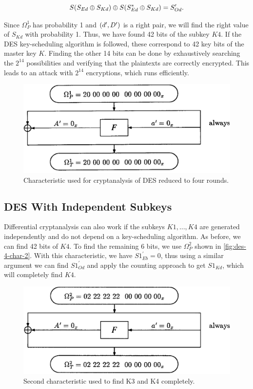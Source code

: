 \documentclass[twoside]{article}
\begin{document}
\begin{equation}
    S(S_{Ed} \oplus S_{Kd}) \oplus S(S^*_{Ed} \oplus S_{Kd}) = S^\prime_{Od}.
    \label{eq:des-4rd-k4}
\end{equation}

Since \(\Omega_P^1\) has probability 1 and \((d^\prime, D^\prime)\) is a
right pair, we will find the right value of \(S_{Kd}\) with probability 1. Thus,
we have found 42 bits of the subkey \(K4\). If the DES key-scheduling algorithm
is followed, these correspond to 42 key bits of the master key \(K\). Finding
the other 14 bits can be done by exhaustively searching the \(2^{14}\)
possibilities and verifying that the plaintexts are correctly encrypted. This
leads to an attack with \(2^{14}\) encryptions, which runs efficiently.

\begin{figure}[!ht]
    \centering
    \includegraphics[width=0.5\linewidth]{images/des_4round_char.png}
    \caption{Characteristic used for cryptanalysis of DES reduced to four rounds.}
    \label{fig:des-4-char}
\end{figure}

\subsection{DES With Independent Subkeys}

Differential cryptanalysis can also work if the subkeys \(K1,\ldots,K4\) are
generated independently and do not depend on a key-scheduling algorithm. As
before, we can find 42 bits of \(K4\). To find the remaining 6 bits, we use
\(\Omega_P^2\) shown in \autoref{fig:des-4-char-2}. With this characteristic, we
have \(S1^\prime_{Eb} = 0\), thus using a similar argument we can find
\(S1^\prime_{Od}\) and apply the counting approach to get \(S1_{Kd}\), which
will completely find \(K4\).

\begin{figure}[!ht]
    \centering
    \includegraphics[width=0.5\linewidth]{images/des_4round_char2.png}
    \caption{Second characteristic used to find K3 and K4 completely.}
    \label{fig:des-4-char-2}
\end{figure}
\end{document}
